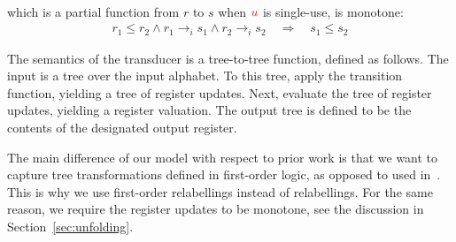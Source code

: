 \begin{definition}
\begin{itemize}
\begin{enumerate}
\begin{align*}
        \end{align*}
        which is a partial function from $r$ to $s$ when ${\color{red}{u}}$ is single-use, is monotone:
        \begin{align*}
            r_1 \leq r_2 \land r_1 \to_i s_1  \land  r_2 \to_i s_2  \quad \Rightarrow \quad  s_1 \leq s_2
        \end{align*}
    \end{enumerate}
\end{itemize}
\end{definition}


The semantics of the transducer is  a tree-to-tree function, defined as follows. The input is a tree over the input alphabet. To this tree,  apply the transition function, yielding a tree of register updates. Next, evaluate the tree of register updates, yielding a register valuation. The output tree is defined to be the contents of the designated output register.


The main difference of our model with respect to prior work is that we want to capture  tree transformations defined in first-order logic, as opposed to \mso used in~\cite{bloem_comparison_2000,alurStreamingStringTransducers2011,alur2017streaming}. This is why we use first-order relabellings instead of  \mso relabellings.  For the same reason, we require the register updates to be monotone, see the discussion in Section~\ref{sec:unfolding}.  

